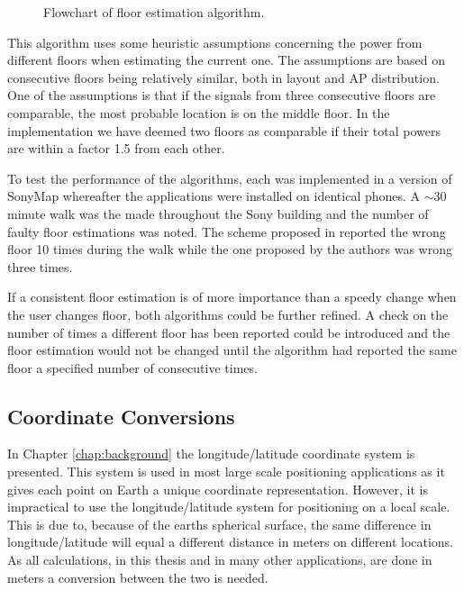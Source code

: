 \documentclass{LTHthesis}
\begin{document}
\begin{figure}
  \caption{Flowchart of floor estimation algorithm. } \label{flowchart}
\end{figure}

This algorithm uses some heuristic assumptions concerning the power from different floors when estimating the current one. The assumptions are based on consecutive floors being relatively similar, both in layout and AP distribution. One of the assumptions is that if the signals from three consecutive floors are comparable, the most probable location is on the middle floor. In the implementation we have deemed two floors as comparable if their total powers are within a factor 1.5 from each other.  

To test the performance of the algorithms, each was implemented in a version of SonyMap whereafter the applications were installed on identical phones. A $\sim$30 minute walk was the made throughout the Sony building and the number of faulty floor estimations was noted. The scheme proposed in \cite{floor_det} reported the wrong floor 10 times during the walk while the one proposed by the authors was wrong three times. 

If a consistent floor estimation is of more importance than a speedy change when the user changes floor, both algorithms could be further refined. A check on the number of times a different floor has been reported could be introduced and the floor estimation would not be changed until the algorithm had reported the same floor a specified number of consecutive times.    

%
\subsection{Coordinate Conversions}
In Chapter \ref{chap:background} the longitude/latitude coordinate system is presented. This system is used in most large scale positioning applications as it gives each point on Earth a unique coordinate representation. However, it is impractical to use the longitude/latitude system for positioning on a local scale. This is due to, because of the earths spherical surface, the same difference in longitude/latitude will equal a different distance in meters on different locations. As all calculations, in this thesis and in many other applications, are done in meters a conversion between the two is needed. 
\end{document}
